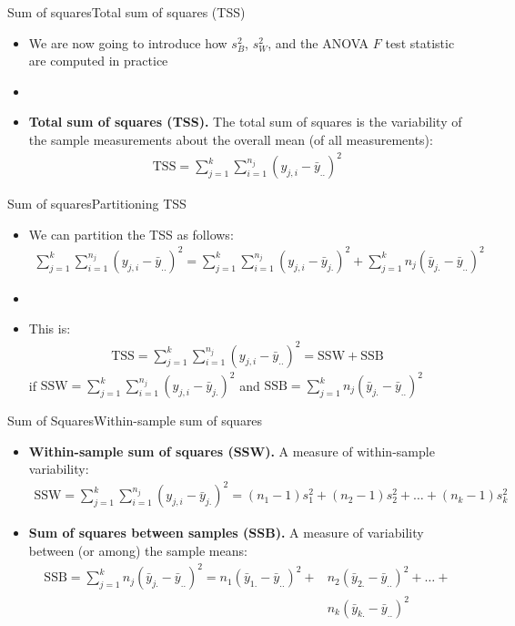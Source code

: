 \documentclass[xcolor=dvipsnames]{beamer}
\begin{document}
\begin{frame}{Sum of squares}{Total sum of squares (TSS)}
	\begin{itemize}
		\item We are now going to introduce how $s^2_B$, $s^2_W$, and the ANOVA $F$ test statistic are computed in practice \pause
		\item[]
		\item \textbf{Total sum of squares (TSS).} The total sum of squares is the variability of the sample measurements about the overall mean (of all measurements): \pause
		\begin{gather*}
			\text{TSS} = \sum_{j=1}^{k} \sum_{i = 1}^{n_j}\left(y_{j,i} - \bar{y}_{..}\right)^2
		\end{gather*}
	\end{itemize}
\end{frame}

\begin{frame}{Sum of squares}{Partitioning TSS}
	\begin{itemize}
		\item We can partition the TSS as follows: \pause
		\begin{gather*}
			\sum_{j=1}^{k} \sum_{i = 1}^{n_j}\left(y_{j,i} - \bar{y}_{..}\right)^2 = \sum_{j=1}^{k}\sum_{i = 1}^{n_j} (y_{j,i}-\bar{y}_{j.})^2 + \sum_{j=1}^k n_j (\bar{y}_{j.} - \bar{y}_{..})^2
		\end{gather*} \pause
		\item[]
		\item This is:
		\begin{gather*}
			\text{TSS} =\sum_{j=1}^{k} \sum_{i = 1}^{n_j}\left(y_{j,i} - \bar{y}_{..}\right)^2 = \text{SSW} + \text{SSB}
		\end{gather*} 
		if $\text{SSW} = \sum_{j=1}^{k}\sum_{i = 1}^{n_j} (y_{j,i}-\bar{y}_{j.})^2$ and $\text{SSB}= \sum_{j=1}^k n_j (\bar{y}_{j.} - \bar{y}_{..})^2$
	\end{itemize}
\end{frame}

\begin{frame}{Sum of Squares}{Within-sample sum of squares}
	\begin{itemize}
		\item \textbf{Within-sample sum of squares (SSW).} A measure of within-sample variability: \pause
		\begin{gather*}
			\text{SSW} = \sum_{j=1}^{k}\sum_{i = 1}^{n_j} (y_{j,i}-\bar{y}_{j.})^2 = (n_1-1)s_1^2 + (n_2-1)s_2^2 + \hdots + (n_k-1)s_k^2
		\end{gather*} \pause
		\item \textbf{Sum of squares between samples (SSB).} A measure of variability between (or among) the sample means: \pause
		\begin{align*}
			\text{SSB} =\sum_{j=1}^k n_j (\bar{y}_{j.} - \bar{y}_{..})^2 = n_1 (\bar{y}_{1.}-\bar{y}_{..})^2 + &n_2 (\bar{y}_{2.}-\bar{y}_{..})^2 + \hdots + \\ &n_k (\bar{y}_{k.}-\bar{y}_{..})^2
		\end{align*}
	\end{itemize}
\end{frame}
\end{document}
